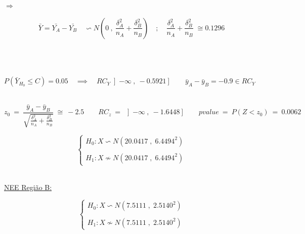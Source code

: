 \hspace{3cm} $\Longrightarrow$ \hspace{1cm}
\begin{minipage}[l]{0pt}
	\[ \bar{Y}=\bar{Y_A}-\bar{Y_B} \quad \backsim N \left( 0\:,\: \frac{\delta_A^2}{n_A}+\frac{\delta_B^2}{n_B} \right) \quad ; \quad \frac{\delta_A^2}{n_A}+\frac{\delta_B^2}{n_B} \; \cong 0.1296 \]
\end{minipage}\\
\\
\\
$P(\bar{Y}_{H_0} \leqslant C)=0.05 \quad \implies \quad RC_Y\left] -\infty \:,\: -0.5921 \right] \qquad \bar{y}_A-\bar{y}_B=-0.9 \in RC_Y $ \\
\\
\begin{minipage}[l]{0pt}
	\[  z_0\:=\: \frac{\bar{y}_A-\bar{y}_B}{\sqrt{\frac{\delta_A^2}{n_A}+\frac{\delta_B^2}{n_B}}}\:\cong\: -2.5 \qquad
	RC_z \:=\: \left] -\infty \:,\: -1.6448 \right]  \qquad
	pvalue \:=\: P(Z<z_0) \:=\: 0.0062 \]
\end{minipage}
\newline
\begin{minipage}[l]{0pt}
	$$\left\lbrace\begin{array}{l}
		H_0: X \backsim N (20.0417\;,\;6.4494^2) \\
		\\
		H_1: X \nsim N (20.0417\;,\;6.4494^2)
	\end{array}\right.$$
\end{minipage}\\
\hspace*{5cm} \underline{NEE Região B:} \\
\begin{minipage}[l]{0pt}
	$$\left\lbrace\begin{array}{l}
		H_0: X \backsim N (7.5111\;,\;2.5140^2) \\
		\\
		H_1: X \nsim N (7.5111\;,\;2.5140^2)
	\end{array}\right.$$
\end{minipage}\\
